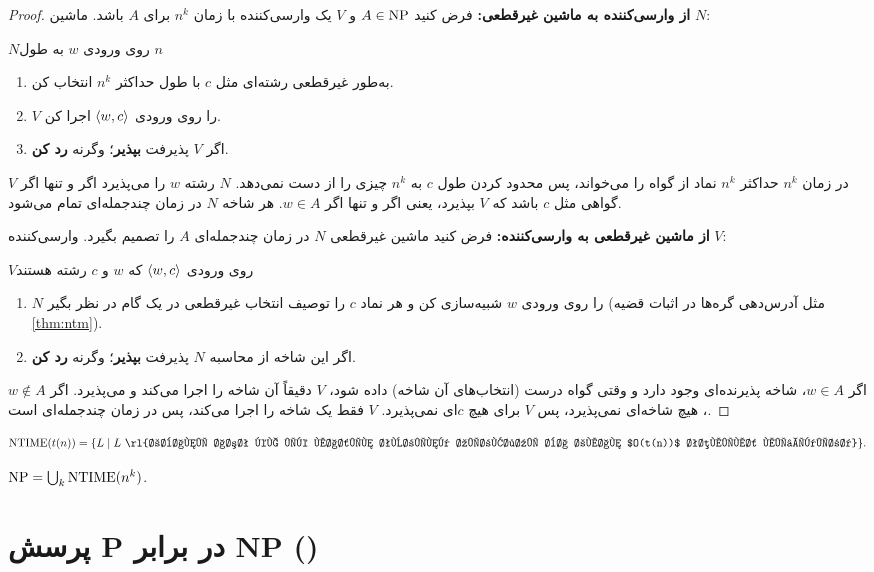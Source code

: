 \begin{proof}
\textbf{از وارسی‌کننده به ماشین غیرقطعی:} فرض کنید $A\in\mathrm{NP}$ و $V$ یک وارسی‌کننده با زمان $n^k$ برای $A$ باشد. ماشین $N$:
\begin{algo}{$N$}{روی ورودی $w$ به طول $n$}
\begin{enumerate}
\item به‌طور غیرقطعی رشته‌ای مثل $c$ با طول حداکثر $n^k$ انتخاب کن.
\item $V$ را روی ورودی $\langle w,c\rangle$ اجرا کن.
\item اگر $V$ پذیرفت \textbf{بپذیر}؛ وگرنه \textbf{رد کن}.
\end{enumerate}
\end{algo}
$V$ در زمان $n^k$ حداکثر $n^k$ نماد از گواه را می‌خواند، پس محدود کردن طول $c$ به $n^k$ چیزی را از دست نمی‌دهد. $N$ رشته $w$ را می‌پذیرد اگر و تنها اگر گواهی مثل $c$ باشد که $V$ بپذیرد، یعنی اگر و تنها اگر $w\in A$. هر شاخه $N$ در زمان چندجمله‌ای تمام می‌شود.

\textbf{از ماشین غیرقطعی به وارسی‌کننده:} فرض کنید ماشین غیرقطعی $N$ در زمان چندجمله‌ای $A$ را تصمیم بگیرد. وارسی‌کننده $V$:
\begin{algo}{$V$}{روی ورودی $\langle w,c\rangle$ که $w$ و $c$ رشته هستند}
\begin{enumerate}
\item $N$ را روی ورودی $w$ شبیه‌سازی کن و هر نماد $c$ را توصیف انتخاب غیرقطعی در یک گام در نظر بگیر (مثل آدرس‌دهی گره‌ها در اثبات قضیه \ref{thm:ntm}).
\item اگر این شاخه از محاسبه $N$ پذیرفت \textbf{بپذیر}؛ وگرنه \textbf{رد کن}.
\end{enumerate}
\end{algo}
اگر $w\in A$، شاخه پذیرنده‌ای وجود دارد و وقتی گواه درست (انتخاب‌های آن شاخه) داده شود، $V$ دقیقاً آن شاخه را اجرا می‌کند و می‌پذیرد. اگر $w\notin A$، هیچ شاخه‌ای نمی‌پذیرد، پس $V$ برای هیچ $c$ای نمی‌پذیرد. $V$ فقط یک شاخه را اجرا می‌کند، پس در زمان چندجمله‌ای است.
\end{proof}

\begin{definition}
\[\mathrm{NTIME}(t(n))=\{L\st L\ \text{\rl{زبانی است که یک ماشین تورینگ غیرقطعی با زمان $O(t(n))$ تصمیمش می‌گیرد}}\}.\]
\end{definition}

\begin{corollary}
$\mathrm{NP}=\bigcup_k\mathrm{NTIME}(n^k)$.
\end{corollary}

\section{پرسش P در برابر NP ()}

